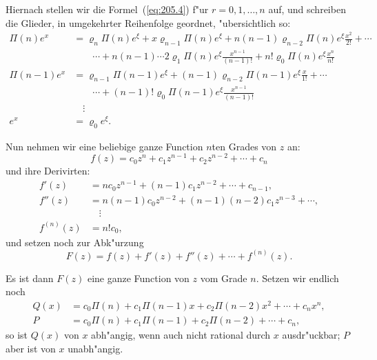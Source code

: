 \documentclass[10pt,a4paper]{article}
\theoremstyle{weberstyle}
\begin{document}
Hiernach stellen wir die Formel~(\ref{eq:205.4}) f"ur $r=0,1,\dots,n$
auf, und schreiben die Glieder, in umgekehrter Reihenfolge geordnet,
"ubersichtlich so:
\begin{equation}\label{eq:205.7}
\begin{aligned}
\Pi(n)e^x &= \varrho_n\Pi(n)e^\xi + x\varrho_{n-1}\Pi(n)e^\xi +
n(n-1)\varrho_{n-2}\Pi(n)e^\xi\frac{x^2}{2!} + \cdots\\
&\qquad\cdots + n(n-1)\cdots 2\varrho_1\Pi(n)e^\xi\frac{x^{n-1}}{(n-1)!}
+ n!\varrho_0\Pi(n)e^\xi\frac{x^n}{n!}\\
\Pi(n-1)e^x &= \varrho_{n-1}\Pi(n-1)e^\xi +
(n-1)\varrho_{n-2}\Pi(n-1)e^\xi\frac{x}{1!} + \cdots\\
&\qquad\cdots + (n-1)!\varrho_0\Pi(n-1)e^\xi\frac{x^{n-1}}{(n-1)!}\\
&\quad\vdots\\
e^x &= \varrho_0 e^\xi.
\end{aligned}
\end{equation}

Nun nehmen wir eine beliebige ganze Function $n$ten Grades von $z$ an:
\begin{equation}\label{eq:205.8}
f(z) = c_0z^n + c_1z^{n-1} + c_2z^{n-2} + \cdots + c_n
\end{equation}
und ihre Derivirten:
\begin{equation}\label{eq:205.9}
\begin{aligned}
f'(z) &= nc_0z^{n-1} + (n-1)c_1z^{n-2} + \cdots + c_{n-1},\\
f''(z) &= n(n-1)c_0z^{n-2} + (n-1)(n-2)c_1z^{n-3} + \cdots,\\
&\quad\vdots\\
f^{(n)}(z) &= n!c_0,
\end{aligned}
\end{equation}
und setzen noch zur Abk"urzung
\begin{equation}\label{eq:205.10}
F(z) = f(z) + f'(z) + f''(z) + \cdots + f^{(n)}(z).
\end{equation}

Es ist dann $F(z)$ eine ganze Function von $z$ vom Grade $n$. Setzen wir
endlich noch
\begin{align}
Q(x) &= c_0\Pi(n) + c_1\Pi(n-1)x + c_2\Pi(n-2)x^2 + \cdots +
c_nx^n,\label{eq:205.11}\\
P &= c_0\Pi(n) + c_1\Pi(n-1) + c_2\Pi(n-2) + \cdots +
c_n,\label{eq:205.12}
\end{align}
so ist $Q(x)$ von $x$ abh"angig, wenn auch nicht rational durch $x$
ausdr"uckbar; $P$ aber ist von $x$ unabh"angig.
\end{document}
